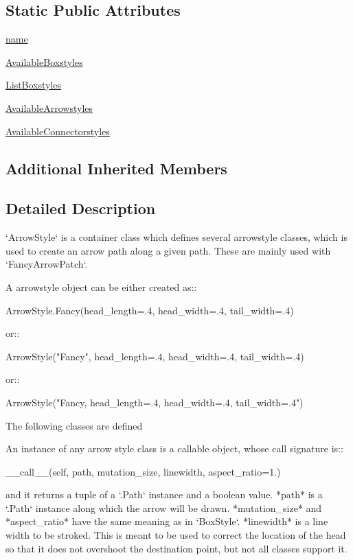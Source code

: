 \subsection*{Static Public Attributes}
\begin{DoxyCompactItemize}
\item 
\hyperlink{classmatplotlib_1_1patches_1_1ArrowStyle_aef62456f52e5800fb2787bfcda630ebd}{name}
\item 
\hyperlink{classmatplotlib_1_1patches_1_1ArrowStyle_af10810a2f2227c7cea3dd8a8a3f2c57e}{Available\+Boxstyles}
\item 
\hyperlink{classmatplotlib_1_1patches_1_1ArrowStyle_ac93d8558743bde3410b570fdc229fd5c}{List\+Boxstyles}
\item 
\hyperlink{classmatplotlib_1_1patches_1_1ArrowStyle_a5a4558c31e16095b3fbf9a7a42467a62}{Available\+Arrowstyles}
\item 
\hyperlink{classmatplotlib_1_1patches_1_1ArrowStyle_a8996dbaf0826eb87eb6ef89f162c7ee2}{Available\+Connectorstyles}
\end{DoxyCompactItemize}
\subsection*{Additional Inherited Members}


\subsection{Detailed Description}
\begin{DoxyVerb}`ArrowStyle` is a container class which defines several
arrowstyle classes, which is used to create an arrow path along a
given path.  These are mainly used with `FancyArrowPatch`.

A arrowstyle object can be either created as::

       ArrowStyle.Fancy(head_length=.4, head_width=.4, tail_width=.4)

or::

       ArrowStyle("Fancy", head_length=.4, head_width=.4, tail_width=.4)

or::

       ArrowStyle("Fancy, head_length=.4, head_width=.4, tail_width=.4")

The following classes are defined


An instance of any arrow style class is a callable object,
whose call signature is::

    __call__(self, path, mutation_size, linewidth, aspect_ratio=1.)

and it returns a tuple of a `.Path` instance and a boolean
value. *path* is a `.Path` instance along which the arrow
will be drawn. *mutation_size* and *aspect_ratio* have the same
meaning as in `BoxStyle`. *linewidth* is a line width to be
stroked. This is meant to be used to correct the location of the
head so that it does not overshoot the destination point, but not all
classes support it.
\end{DoxyVerb}
 

